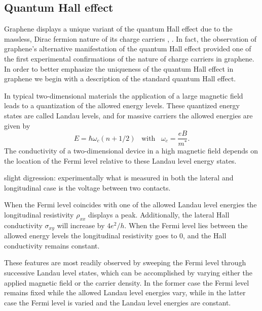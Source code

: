 \documentclass[edeposit,fullpage,draftthesis]{uiucthesis2009}
\begin{document}
	\subsection{Quantum Hall effect}
    Graphene displays a unique variant of the quantum Hall effect due to the massless, 
    Dirac fermion nature of its charge carriers \cite{Novoselov2005}, \cite{Zhang2005}. In fact,
    the observation of graphene's alternative manifestation of the quantum Hall effect provided
    one of the first experimental confirmations of the nature of charge carriers in graphene.
    In order to better emphasize the uniqueness of the quantum Hall effect
    in graphene we begin with a description of the standard quantum Hall effect.
    
    In typical two-dimensional materials the application of a large magnetic 
    field leads to a quantization of the allowed energy levels. These quantized energy states are 
    called Landau levels, and for massive carriers the allowed energies are given by
    \begin{equation}
        E=\hbar \omega_c (n + 1/2) \;\;\; \text{with} \;\;\; \omega_c = \frac{e B}{m^*}.
    \end{equation}
    The conductivity of a two-dimensional device in a high magnetic field depends on the location of the Fermi level
    relative to these Landau level energy states.
    
    slight digression: experimentally what is measured in both the lateral and longitudinal case is the 
    voltage between two contacts.
    
    When the Fermi level coincides with one of the allowed Landau level energies the longitudinal 
    resistivity $\rho_{xx}$ displays a peak.
    Additionally, the lateral Hall conductivity $\sigma_{xy}$ will increase by $4 e^2/h$.
    When the Fermi level lies between the allowed energy levels the longitudinal resistivity goes to 0,
    and the Hall conductivity remains constant.
    
    These features are most readily observed by sweeping the Fermi level through successive Landau
    level states, which can be accomplished by varying either the applied magnetic field
    or the carrier density. In the former case the Fermi level remains fixed while the allowed Landau level energies
    vary, while in the latter case the Fermi level is varied and the Landau level energies are constant.
    
\end{document}
